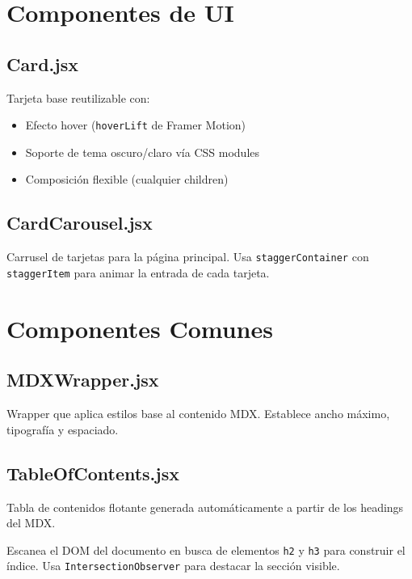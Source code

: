 \documentclass[12pt,a4paper]{article}
\begin{document}
\section{Componentes de UI}

\subsection{Card.jsx}

Tarjeta base reutilizable con:
\begin{itemize}
  \item Efecto hover (\texttt{hoverLift} de Framer Motion)
  \item Soporte de tema oscuro/claro vía CSS modules
  \item Composición flexible (cualquier children)
\end{itemize}

\subsection{CardCarousel.jsx}

Carrusel de tarjetas para la página principal. Usa \texttt{staggerContainer} con \texttt{staggerItem} para animar la entrada de cada tarjeta.

\section{Componentes Comunes}

\subsection{MDXWrapper.jsx}

Wrapper que aplica estilos base al contenido MDX. Establece ancho máximo, tipografía y espaciado.

\subsection{TableOfContents.jsx}

Tabla de contenidos flotante generada automáticamente a partir de los headings del MDX.

\begin{mdframed}[style=propbox]
Escanea el DOM del documento en busca de elementos \texttt{h2} y \texttt{h3} para construir el índice. Usa \texttt{IntersectionObserver} para destacar la sección visible.
\end{mdframed}
\end{document}
